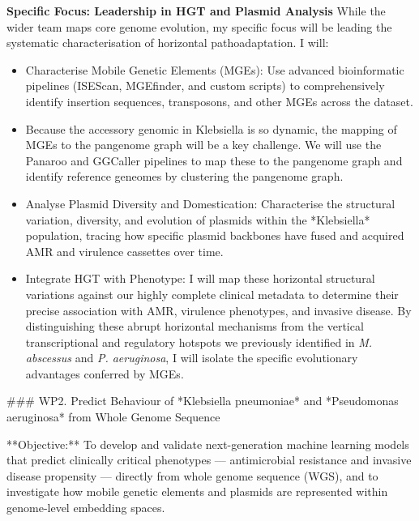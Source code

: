 \documentclass{article}
\begin{document}
\textbf{Specific Focus: Leadership in HGT and Plasmid Analysis}
While the wider team maps core genome evolution, my specific focus will be leading the systematic characterisation of horizontal pathoadaptation. I will:
\begin{itemize}
\item Characterise Mobile Genetic Elements (MGEs): Use advanced bioinformatic pipelines (ISEScan, MGEfinder, and custom scripts) to comprehensively identify insertion sequences, transposons, and other MGEs across the dataset. 
\item Because the accessory genomic in Klebsiella is so dynamic, the mapping of MGEs to the pangenome graph will be a key challenge. We will use the Panaroo and GGCaller pipelines to map these to the pangenome graph and identify reference geneomes by clustering the pangenome graph.
\item Analyse Plasmid Diversity and Domestication: Characterise the structural variation, diversity, and evolution of plasmids within the *Klebsiella* population, tracing how specific plasmid backbones have fused and acquired AMR and virulence cassettes over time. 
\item Integrate HGT with Phenotype: I will map these horizontal structural variations against our highly complete clinical metadata to determine their precise association with AMR, virulence phenotypes, and invasive disease. By distinguishing these abrupt horizontal mechanisms from the vertical transcriptional and regulatory hotspots we previously identified in \textit{M. abscessus} and \textit{P. aeruginosa}, I will isolate the specific evolutionary advantages conferred by MGEs.\end{itemize} 

### WP2. Predict Behaviour of *Klebsiella pneumoniae* and *Pseudomonas aeruginosa* from Whole Genome Sequence

**Objective:** To develop and validate next-generation machine learning models that predict clinically critical phenotypes — antimicrobial resistance and invasive disease propensity — directly from whole genome sequence (WGS), and to investigate how mobile genetic elements and plasmids are represented within genome-level embedding spaces.
\end{document}
